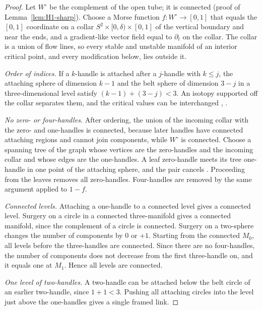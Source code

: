\documentclass[11pt]{amsart}
\theoremstyle{definition}
\theoremstyle{remark}
\theoremstyle{plain}
\numberwithin{equation}{section}
\begin{document}
\begin{proof}
Let $W^\circ$ be the complement of the open tube; it is connected
(proof of Lemma~\ref{lem:H1-sharp}). Choose a Morse function
$f\colon W^\circ\to[0,1]$ that equals the $[0,1]$ coordinate on a collar
$S^2\times[0,\delta)\times[0,1]$ of the vertical boundary and near the
ends, and a gradient-like vector field equal to $\partial_t$ on the
collar. The collar is a union of flow lines, so every stable and
unstable manifold of an interior critical point, and every modification
below, lies outside it.

\emph{Order of indices.} If a $k$-handle is attached after a $j$-handle
with $k\le j$, the attaching sphere of dimension $k-1$ and the belt
sphere of dimension $3-j$ in a three-dimensional level satisfy
$(k-1)+(3-j)<3$. An isotopy supported off the collar separates them, and
the critical values can be interchanged
\cite[Section~4]{Milnor-h-cob}, \cite[Propositions~4.2.7 and~4.2.13]{GS}.

\emph{No zero- or four-handles.} After ordering, the union of the incoming
collar with the zero- and one-handles is connected, because later handles
have connected attaching regions and cannot join components, while
$W^\circ$ is connected. Choose a spanning tree of the graph whose
vertices are the zero-handles and the incoming collar and whose edges are
the one-handles. A leaf zero-handle meets its tree one-handle in one
point of the attaching sphere, and the pair cancels
\cite[Theorem~5.4]{Milnor-h-cob}. Proceeding from the leaves removes all
zero-handles. Four-handles are removed by the same argument applied to
$1-f$.

\emph{Connected levels.} Attaching a one-handle to a connected level
gives a connected level. Surgery on a circle in a connected
three-manifold gives a connected manifold, since the complement of a
circle is connected. Surgery on a two-sphere changes the number of
components by $0$ or $+1$. Starting from the connected $M_0$, all levels
before the three-handles are connected. Since there are no four-handles,
the number of components does not decrease from the first three-handle
on, and it equals one at $M_1$. Hence all levels are connected.

\emph{One level of two-handles.} A two-handle can be attached below the
belt circle of an earlier two-handle, since $1+1<3$. Pushing all
attaching circles into the level just above the one-handles gives a
single framed link.
\end{proof}
\end{document}
